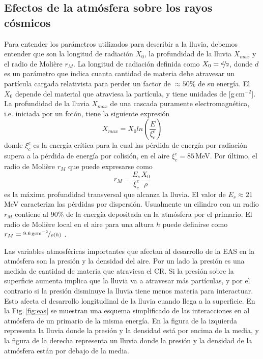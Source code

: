 \subsection{Efectos de la atmósfera sobre los rayos cósmicos}


Para entender los parámetros utilizados para describir a la lluvia, debemos entender que son la longitud de radiación $X_0$, la profundidad de la lluvia $X_{max}$ y el radio de Molière $r_M$. La longitud de radiación definida como $X_0=\nicefrac{d}{2}$,  donde $d$ es un parámetro que indica cuanta cantidad de materia debe atravesar un partícula cargada relativista para perder un factor de $\approx 50\%$ de su  energía. El $X_0$ depende del material que atraviesa la partícula, y tiene unidades de [g\,cm$^{-2}$]. La profundidad de la lluvia $X_{max}$ de una cascada puramente electromagnética, i.e. iniciada por un fotón, tiene la siguiente expresión \cite{matthews2005heitler}
\begin{equation}
 	X_{max} = X_0{ln(\frac{E}{\xi^e_c})}
 \end{equation} 
donde  $\xi^e_c$ es la energía crítica para la cual las pérdida de energía por radiación supera a la pérdida de energía por colisión, en el aire $\xi^e_c=85\,$MeV. Por último, el radio de Molière $r_M$ que puede expresarse como 
\begin{equation}
	r_M= \frac{E_s}{\xi^e_c}\frac{X_0}{\rho}
\end{equation}
es la máxima profundidad transversal que alcanza la lluvia. El valor de $E_s\approx21\,$MeV caracteriza las pérdidas por dispersión. Usualmente un cilindro con un radio $r_M$ contiene al 90\% de la energía depositada en la atmósfera por el primario. El radio de Molière local en el aire para una altura $h$ puede definirse como $r_M = \nicefrac{9.6\,\text{gcm}^{-2}}{\rho(h)}$ \cite{gora2006universal}. 

Las variables atmosféricas importantes que afectan al desarrollo de la EAS en la atmósfera son la presión y la densidad del aire. Por un lado la presión es una medida de cantidad de materia que atraviesa el CR. Si la presión sobre la superficie aumenta implica que la lluvia va a atravesar más partículas, y por el contrario si la presión disminuye la lluvia tiene menos materia para interactuar. Esto afecta el desarrollo longitudinal de la lluvia cuando llega a la superficie. En la Fig.\,\ref{fig:eas} se muestran una esquema simplificado de las interacciones en al atmósfera de un primario de la misma energía. En la figura de la izquierda representa la lluvia donde la presión y la densidad está por encima de la media, y la figura de la derecha representa un lluvia donde la presión y la densidad de la atmósfera están por debajo de la media.

